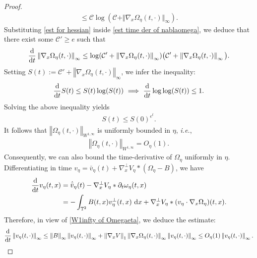 \documentclass[11pt,reqno]{amsart}
\numberwithin{equation}{section}
\def\dd{{\rm d}}
\begin{document}
\begin{proof}
\begin{align}
\leq \mathcal{C}\log(\mathcal{C}+\Vert \nabla_{x}\Omega_{\eta}(t,\cdot)\Vert_{\infty}). 
\label{est for hessian}  
\end{align}
Substituting \eqref{est for hessian} inside \eqref{est time der of nablaomega}, 
we deduce that 
there exist some $\mathcal{C}'\geq e$ such that 
\begin{align*}
\frac{\dd}{\dd t}\left\Vert \nabla_{x}\Omega_{\eta}(t,\cdot)\right\Vert_{\infty}\leq \log(\mathcal{C}'+\left\Vert \nabla_{x}\Omega_{\eta}(t,\cdot)\right\Vert_{\infty})
\big(\mathcal{C}'+\left\Vert \nabla_{x}\Omega_{\eta}(t,\cdot)\right\Vert_{\infty}\big).      
\end{align*}
Setting $S(t):= \mathcal{C}'+\left\Vert \nabla_{x}\Omega_{\eta}(t,\cdot)\right\Vert_{\infty}$, 
we infer the inequality: 
\begin{align*}
\frac{\dd}{\dd t}S(t)\leq S(t)\log(S(t))\,\,\Longrightarrow\,\, \frac{\dd}{\dd t}\log\log(S(t))\leq 1.
\end{align*}
Solving the above inequality yields 
\begin{align*}
S(t)\leq S(0)^{e^{t}}.     
\end{align*}
It follows that 
$\left\Vert \Omega_{\eta}(t,\cdot)\right\Vert_{W^{1,\infty}}$ is uniformly bounded in $\eta$, 
{\it i.e.}, 
\begin{align}
\left\Vert \Omega_{\eta}(t,\cdot)\right\Vert_{W^{1,\infty}}= O_{\eta}(1).  \label{W1infty of Omegaeta} \end{align}
Consequently, we can also bound the time-derivative of $\Omega_{\eta}$ uniformly in $\eta$. 
Differentiating in time $v_{\eta}=\bar{v}_{\eta}(t)+\nabla_{x}^{\perp}V_{\eta}\ast (\Omega_{\eta}-B)$,
we have
\begin{align*}
\frac{\dd}{\dd t}v_{\eta}(t,x)&=\dot{\bar{v}}_{\eta}(t)-\nabla_{x}^{\perp}V_{\eta}\ast \partial_{t}\omega_{\eta}(t,x)\\
&=-\int_{\mathbb{T}^{2}}B(t,x)v_{\eta}^{\perp}(t,x)\ \dd x+\nabla_{x}^{\perp}V_{\eta}\ast (v_{\eta}\cdot \nabla_{x}\Omega_{\eta})(t,x). 
\end{align*}
Therefore, in view of \eqref{W1infty of Omegaeta}, we deduce the estimate: 
\begin{align*}
\frac{\dd}{\dd t}\left\Vert v_{\eta}(t,\cdot)\right\Vert_{\infty}\leq \left\Vert B\right\Vert_{\infty} \left\Vert v_{\eta}(t,\cdot)\right\Vert_{\infty}+\left\Vert \nabla_{x}V\right\Vert_{1} \left\Vert \nabla_{x}\Omega_{\eta}(t,\cdot)\right\Vert_{\infty} \left\Vert v_{\eta}(t,\cdot)\right\Vert_{\infty}\leq O_{\eta}(1)\left\Vert v_{\eta}(t,\cdot)\right\Vert_{\infty}.          

\end{align*}
\end{proof}
\end{document}
